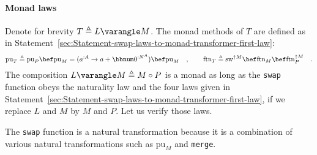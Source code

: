 \paragraph{Monad laws}

Denote for brevity $T\triangleq L\varangle M$. The monad methods
of $T$ are defined as in Statement~\ref{sec:Statement-swap-laws-to-monad-transformer-first-law}:
\[
\text{pu}_{T}\triangleq\text{pu}_{P}\bef\text{pu}_{M}=(a^{:A}\rightarrow a+\bbnum 0^{:N^{A}})\bef\text{pu}_{M}\quad,\quad\quad\text{ftn}_{T}\triangleq\text{sw}^{\uparrow M}\bef\text{ftn}_{M}\bef\text{ftn}_{P}^{\uparrow M}\quad.
\]
The composition $L\varangle M\triangleq M\circ P$ is a monad as long
as the \lstinline!swap! function obeys the naturality law and the
four laws given in Statement~\ref{sec:Statement-swap-laws-to-monad-transformer-first-law},
if we replace $L$ and $M$ by $M$ and $P$. Let us verify those
laws.

The \lstinline!swap! function is a natural transformation because
it is a combination of various natural transformations such as $\text{pu}_{M}$
and \lstinline!merge!.

